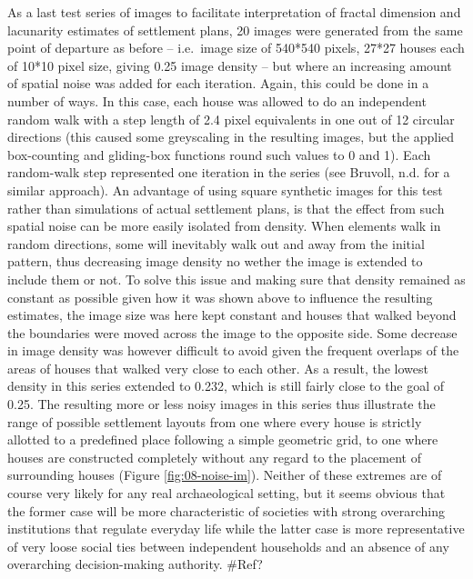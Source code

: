 \documentclass[
  12pt,
]{book}
\begin{document}
As a last test series of images to facilitate interpretation of fractal dimension and lacunarity estimates of settlement plans, 20 images were generated from the same point of departure as before -- i.e.~image size of 540*540 pixels, 27*27 houses each of 10*10 pixel size, giving 0.25 image density -- but where an increasing amount of spatial noise was added for each iteration. Again, this could be done in a number of ways. In this case, each house was allowed to do an independent random walk with a step length of 2.4 pixel equivalents in one out of 12 circular directions (this caused some greyscaling in the resulting images, but the applied box-counting and gliding-box functions round such values to 0 and 1). Each random-walk step represented one iteration in the series (see Bruvoll, n.d. for a similar approach). An advantage of using square synthetic images for this test rather than simulations of actual settlement plans, is that the effect from such spatial noise can be more easily isolated from density. When elements walk in random directions, some will inevitably walk out and away from the initial pattern, thus decreasing image density no wether the image is extended to include them or not. To solve this issue and making sure that density remained as constant as possible given how it was shown above to influence the resulting estimates, the image size was here kept constant and houses that walked beyond the boundaries were moved across the image to the opposite side. Some decrease in image density was however difficult to avoid given the frequent overlaps of the areas of houses that walked very close to each other. As a result, the lowest density in this series extended to 0.232, which is still fairly close to the goal of 0.25. The resulting more or less noisy images in this series thus illustrate the range of possible settlement layouts from one where every house is strictly allotted to a predefined place following a simple geometric grid, to one where houses are constructed completely without any regard to the placement of surrounding houses (Figure \ref{fig:08-noise-im}). Neither of these extremes are of course very likely for any real archaeological setting, but it seems obvious that the former case will be more characteristic of societies with strong overarching institutions that regulate everyday life while the latter case is more representative of very loose social ties between independent households and an absence of any overarching decision-making authority. \#Ref?
\end{document}
